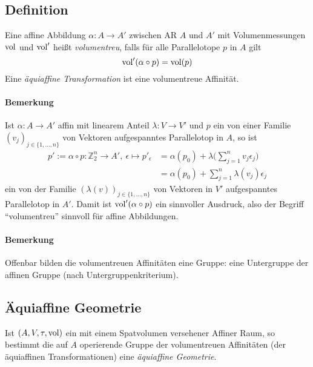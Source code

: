  \subsection{Definition}
 	\begin{Definition}
 		Eine affine Abbildung $ \alpha:A\to A' $ zwischen AR $ A $ und $ A' $ mit Volumenmessungen $ \operatorname{vol} $ und $ \operatorname{vol}' $ heißt \emph{volumentreu}, falls für alle Parallelotope $ p $ in $ A $ gilt
 		\[
 			\operatorname{vol}'(\alpha\circ p)=\operatorname{vol}(p)
 		\]
 		Eine \emph{äquiaffine Transformation} ist eine volumentreue Affinität.
 	\end{Definition}
 	\paragraph{Bemerkung}
 		Ist $ \alpha:A\to A' $ affin mit linearem Anteil $ \lambda:V \to V' $ und $ p $ ein von einer Familie $ (v_j)_{j\in\{1,\dots,n\}} $ von Vektoren aufgespanntes Parallelotop in $ A $, so ist
 		\begin{align*}
 			p':= \alpha\circ p:\mathbb{Z}_2^n\to A',\ \epsilon \mapsto p'_\epsilon & = \alpha(p_0)+\lambda\Big(\sum_{j=1}^{n}v_j\epsilon_j\Big) \\
 			                                                                       & = \alpha(p_0)+\sum_{j=1}^{n}\lambda(v_j)\epsilon_j
 		\end{align*}
 		ein von der Familie $ (\lambda(v))_{j\in \{1,\dots,n\}} $ von Vektoren in $ V' $ aufgespanntes Parallelotop in $ A' $. Damit ist $ \operatorname{vol}'(\alpha\circ p) $ ein sinnvoller Ausdruck, also der Begriff "`volumentreu"' sinnvoll für affine Abbildungen.
 	\paragraph{Bemerkung}
 		Offenbar bilden die volumentreuen Affinitäten eine Gruppe: eine Untergruppe der affinen Gruppe (nach Untergruppenkriterium).
 \subsection{Äquiaffine Geometrie}
 	\begin{Definition}
 		Ist $ (A,V,\tau,\operatorname{vol}) $ ein mit einem Spatvolumen versehener Affiner Raum, so bestimmt die auf $ A $ operierende Gruppe der volumentreuen Affinitäten (der äquiaffinen Transformationen) eine \emph{äquiaffine Geometrie}.
 	\end{Definition}
